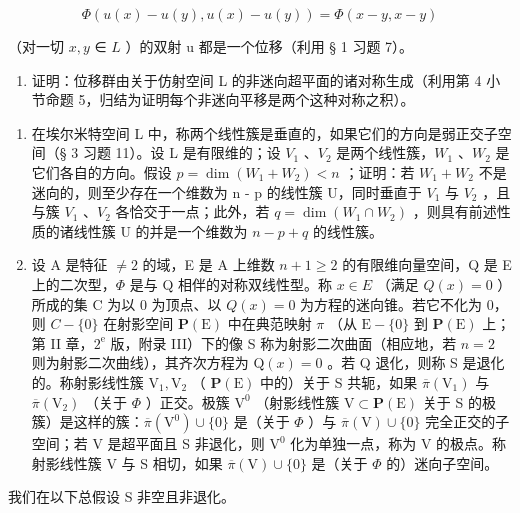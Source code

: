 \[
\Phi (u (x) - u (y), u (x) - u (y)) = \Phi (x - y, x - y)
\]

（对一切 \(x, y\) ∈ \(L\) ）的双射 u 都是一个位移（利用 § 1 习题 7）。

\begin{enumerate}
\def\labelenumi{\alph{enumi})}
\setcounter{enumi}{1}
\tightlist
\item
  证明：位移群由关于仿射空间 L 的非迷向超平面的诸对称生成（利用第 4 小节命题 5，归结为证明每个非迷向平移是两个这种对称之积）。
\end{enumerate}

\begin{enumerate}
\def\labelenumi{\arabic{enumi})}
\setcounter{enumi}{21}
\item
在埃尔米特空间 L 中，称两个线性簇是垂直的，如果它们的方向是弱正交子空间（§ 3 习题 11）。设 L 是有限维的；设 \(V_{1}\) 、\(V_{2}\) 是两个线性簇，\(W_{1}\) 、\(W_{2}\) 是它们各自的方向。假设 \(p = \dim(W_{1} + W_{2}) < n\) ；证明：若 \(W_{1} + W_{2}\) 不是迷向的，则至少存在一个维数为 n - p 的线性簇 U，同时垂直于 \(V_{1}\) 与 \(V_{2}\) ，且与簇 \(V_{1}\) 、\(V_{2}\) 各恰交于一点；此外，若 \(q = \dim(W_{1} \cap W_{2})\) ，则具有前述性质的诸线性簇 U 的并是一个维数为 \(n - p + q\) 的线性簇。
\item
设 A 是特征 \(\neq 2\) 的域，E 是 A 上维数 \(n + 1 \geqslant 2\) 的有限维向量空间，Q 是 E 上的二次型，\(\Phi\) 是与 Q 相伴的对称双线性型。称 \(x \in E\) （满足 \(Q(x) = 0\) ）所成的集 C 为以 0 为顶点、以 \(Q(x) = 0\) 为方程的迷向锥。若它不化为 0，则 \(C - \{0\}\) 在射影空间 \(\mathbf{P}(\mathrm{E})\) 中在典范映射 \(\pi\) （从 \(\mathrm{E}-\{0\}\) 到 \(\mathbf{P}(\mathrm{E})\) 上；第 II 章，\(2^{\mathrm{e}}\) 版，附录 III）下的像 S 称为射影二次曲面（相应地，若 \(n=2\) 则为射影二次曲线），其齐次方程为 \(\mathrm{Q}(x)=0\) 。若 Q 退化，则称 S 是退化的。称射影线性簇 \(\mathrm{V}_{1}, \mathrm{V}_{2}\) （ \(\mathbf{P}(\mathrm{E})\) 中的）关于 S 共轭，如果 \(\overline{\pi}(\mathrm{V}_{1})\) 与 \(\overline{\pi}(\mathrm{V}_{2})\) （关于 \(\Phi\) ）正交。极簇 \(\mathrm{V}^{0}\) （射影线性簇 \(\mathrm{V}\subset\mathbf{P}(\mathrm{E})\) 关于 S 的极簇）是这样的簇：\(\overline{\pi}(\mathrm{V}^{0})\cup\{0\}\) 是（关于 \(\Phi\) ）与 \(\overline{\pi}(\mathrm{V})\cup\{0\}\) 完全正交的子空间；若 V 是超平面且 S 非退化，则 \(\mathrm{V}^{0}\) 化为单独一点，称为 V 的极点。称射影线性簇 V 与 S 相切，如果 \(\overline{\pi}(\mathrm{V})\cup\{0\}\) 是（关于 \(\Phi\) 的）迷向子空间。
\end{enumerate}

我们在以下总假设 S 非空且非退化。

